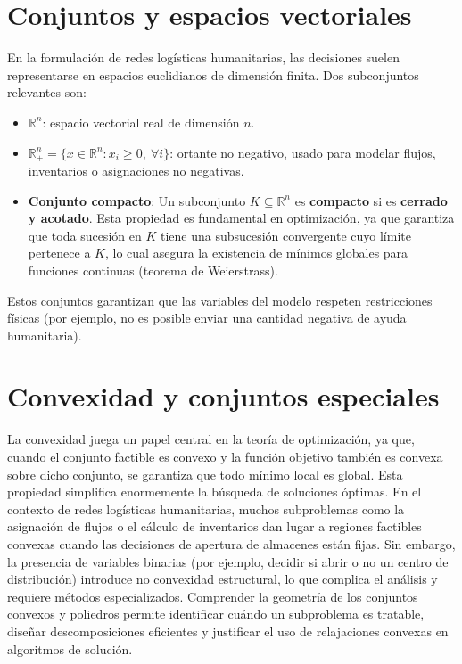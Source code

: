 \documentclass[
  spanish,
  us-letterpaper,
]{scrreprt}
\providecommand{\tightlist}{%
  \setlength{\itemsep}{0pt}\setlength{\parskip}{0pt}}
\numberwithin{equation}{section}
\begin{document}
\section{Conjuntos y espacios vectoriales}\label{sec-compacto}

En la formulación de redes logísticas humanitarias, las decisiones
suelen representarse en espacios euclidianos de dimensión finita. Dos
subconjuntos relevantes son:

\begin{itemize}
\tightlist
\item
  \textbf{\(\mathbb{R}^n\)}: espacio vectorial real de dimensión \(n\).
\item
  \textbf{\(\mathbb{R}_{+}^n = \{x \in \mathbb{R}^n : x_i \geq 0,\ \forall i\}\)}:
  ortante no negativo, usado para modelar flujos, inventarios o
  asignaciones no negativas.
\item
  \textbf{Conjunto compacto}: Un subconjunto
  \(K \subseteq \mathbb{R}^n\) es \textbf{compacto} si es
  \textbf{cerrado y acotado}. Esta propiedad es fundamental en
  optimización, ya que garantiza que toda sucesión en \(K\) tiene una
  subsucesión convergente cuyo límite pertenece a \(K\), lo cual asegura
  la existencia de mínimos globales para funciones continuas (teorema de
  Weierstrass).
\end{itemize}

Estos conjuntos garantizan que las variables del modelo respeten
restricciones físicas (por ejemplo, no es posible enviar una cantidad
negativa de ayuda humanitaria).

\section{Convexidad y conjuntos especiales}\label{sec-conjuntosE}

La convexidad juega un papel central en la teoría de optimización, ya
que, cuando el conjunto factible es convexo y la función objetivo
también es convexa sobre dicho conjunto, se garantiza que todo mínimo
local es global. Esta propiedad simplifica enormemente la búsqueda de
soluciones óptimas. En el contexto de redes logísticas humanitarias,
muchos subproblemas como la asignación de flujos o el cálculo de
inventarios dan lugar a regiones factibles convexas cuando las
decisiones de apertura de almacenes están fijas. Sin embargo, la
presencia de variables binarias (por ejemplo, decidir si abrir o no un
centro de distribución) introduce no convexidad estructural, lo que
complica el análisis y requiere métodos especializados. Comprender la
geometría de los conjuntos convexos y poliedros permite identificar
cuándo un subproblema es tratable, diseñar descomposiciones eficientes y
justificar el uso de relajaciones convexas en algoritmos de solución.
\end{document}
